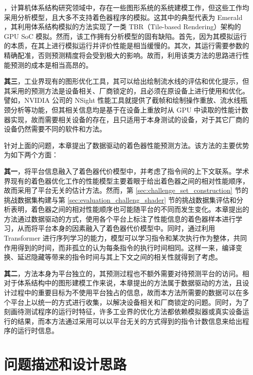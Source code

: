 {，计算机体系结构研究领域中，存在一些图形系统的系统建模工作，但这些工作均采用分析模型，且大多不支持着色器程序的模拟。这其中的典型代表为 Emerald \cite{10.1145/3307650.3322221}，其利用体系结构模拟的方法实现了一类 TBR（Tile-based Rendering）架构的 GPU SoC 模拟。然而，该工作拥有分析模型的固有缺陷。首先，因为其模拟运行的本质，在其上进行模拟运行并评价性能是相当缓慢的。其次，其运行需要参数的精确配准，否则预测精度将会受到极大的影响。故而，利用该类方法的思路进行性能预测的成本是相当高昂的。

{\bf 其三}，工业界现有的图形优化工具，其可以给出绘制流水线的评估和优化提示，但其采用的预测方法是设备相关、厂商锁定的，且必须在原设备上进行使用和优化。譬如，NVIDIA 公司的 NSight \cite{NSightGraphics} 性能工具就提供了截帧和绘制操作重放、流水线瓶颈分析等功能，但其相关信息均是基于在设备上重放时从 GPU 中读取的性能计数器实现，故而需要相关设备的存在，且只适用于本身测试的设备，对于其它厂商的设备仍然需要不同的软件和方法。

针对上面的问题，本章提出了数据驱动的着色器性能预测方法。该方法的主要优势为如下两个方面：

{\bf 其一}，将平台信息融入了着色器代价模型中，并考虑了指令间的上下文联系。学术界现有的着色器优化工作的性能模型主要着眼于给出着色器之间的相对性能顺序，故而采用了平台无关的估计方法。然而，第 \ref{sec:challenge_set_construction} 节的挑战数据集构建与第 \ref{sec:evaluation_challeng_shader} 节的挑战数据集评估和分析表明，着色器之间的相对性能顺序也可能随平台的不同而发生变化。本章提出的方法通过数据驱动的方式，使用各个平台上标注了性能信息的着色器样本进行学习，从而将平台本身的因素融入了着色器代价模型中。同时，通过利用 Transformer 进行序列学习的能力，模型可以学习指令和某次执行作为整体，共同作用得到的时间，而非孤立的认为每条指令的执行时间相同。这样一来，编译变换、延迟隐藏等带来的指令时间与其上下文之间的相关性就得到了考虑。

{\bf 其二}，方法本身为平台独立的，其预测过程也不额外需要对待预测平台的访问。相对于体系结构中的图形建模工作来说，本章提出的方法属于数据驱动的方法，且设计过程中的重要目标为不使用平台独占的信息，故而本方法所需要的数据可以在多个平台上以统一的方式进行收集，以解决设备相关和厂商锁定的问题。同时，为了刻画待测试程序的运行时特征，许多工业界的优化方法都依赖模拟器或真实设备运行的结果，而本方法通过采用可以以平台无关的方式得到的指令计数信息来给出程序的运行时信息。
}

\section{问题描述和设计思路}

